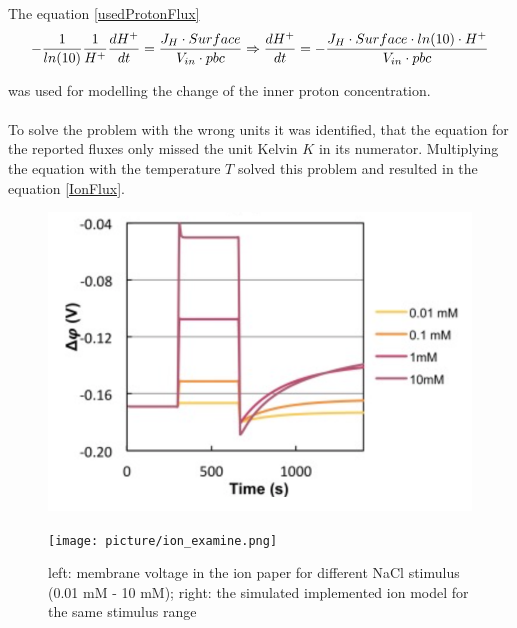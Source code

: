 The equation \ref{usedProtonFlux} 
\begin{equation}\label{usedProtonFlux}
- \frac{1}{ln(10)} \frac{1}{H^+}\frac{dH^+}{dt} = \frac{J_H \cdot Surface}{V_{in} \cdot pbc}\\
\Rightarrow \frac{dH^+}{dt}=-\frac{J_H \cdot Surface \cdot ln(10) \cdot H^+}{V_{in} \cdot pbc}
\end{equation}

was used for modelling the change of the inner proton concentration.\\\\
To solve the problem with the wrong units it was identified, that the equation for the reported fluxes only missed the unit Kelvin $K$ in its numerator. Multiplying the equation with the temperature $T$ solved this problem and resulted in the equation \ref{IonFlux}.
\begin{figure}[htbp]
	
	\begin{minipage}{0,5\textwidth}
		
		\includegraphics[width=\textwidth]{picture/Ion_Paper.png}
		
		\label{IonPaper} 
	\end{minipage}
	\begin{minipage}{0,5\textwidth}
		
		\texttt{[image: picture/ion\_examine.png]}
		
		\label{IonImplemented} 
	\end{minipage}
	\caption{left: membrane voltage in the ion paper for different NaCl stimulus (0.01 mM - 10 mM); right: the simulated implemented ion model for the same stimulus range }
\end{figure}

